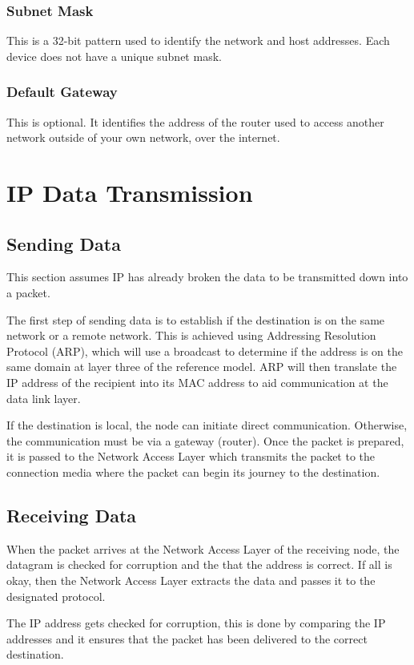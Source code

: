 \subsubsection*{Subnet Mask}
This is a 32-bit pattern used to identify the network and host addresses. Each device does not have a unique subnet mask.
\subsubsection*{Default Gateway}
This is optional. It identifies the address of the router used to access another network outside of your own network, over the internet.

\section*{IP Data Transmission}
\subsection*{Sending Data}
This section assumes IP has already broken the data to be transmitted down into a packet.

The first step of sending data is to establish if the destination is on the same network or a remote network. This is achieved using Addressing Resolution Protocol (ARP), which will use a broadcast to determine if the address is on the same domain at layer three of the reference model. ARP will then translate the IP address of the recipient into its MAC address to aid communication at the data link layer.

If the destination is local, the node can initiate direct communication. Otherwise, the communication must be via a gateway (router). Once the packet is prepared, it is passed to the Network Access Layer which transmits the packet to the connection media where the packet can begin its journey to the destination.

\subsection*{Receiving Data}
When the packet arrives at the Network Access Layer of the receiving node, the datagram is checked for corruption and the that the address is correct. If all is okay, then the Network Access Layer extracts the data and passes it to the designated protocol. 

The IP address gets checked for corruption, this is done by comparing the IP addresses and it ensures that the packet has been delivered to the correct destination.

